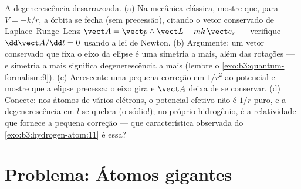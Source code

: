 \begin{exercise}[$\star\star\star$]\label{exo:b3:hydrogen-atom:12}
A degenerescência desarrazoada. (a) Na mecânica clássica, mostre que,
para $V = -k/r$, a órbita se fecha (sem precessão), citando o vetor
conservado de Laplace--Runge--Lenz $\vect A = \vect p\wedge\vect
L - mk\,\vect e_r$ --- verifique $\dd\vect A/\dd t = 0$ usando a lei de
Newton. (b) Argumente: um vetor conservado que fixa o eixo da elipse é
uma simetria a mais, além das rotações --- e simetria a mais significa
degenerescência a mais (lembre o \cref{exo:b3:quantum-formalism:9}).
(c) Acrescente uma pequena correção em $1/r^2$ ao potencial e mostre
que a elipse precessa: o eixo gira e $\vect A$ deixa de se conservar.
(d) Conecte: nos átomos de vários elétrons, o potencial efetivo não é
$1/r$ puro, e a degenerescência em $l$ se quebra (o sódio!); no próprio
hidrogênio, é a relatividade que fornece a pequena correção --- que
característica observada do \cref{exo:b3:hydrogen-atom:11} é essa?
\end{exercise}

\section{Problema: Átomos gigantes}

